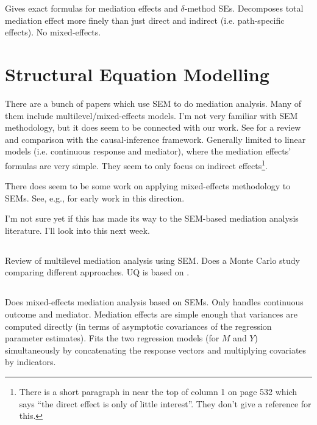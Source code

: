 \documentclass{article}
\begin{document}
Gives exact formulas for mediation effects and $\delta$-method SEs. Decomposes total mediation effect more finely than just direct and indirect (i.e. path-specific effects). No mixed-effects.

\section{Structural Equation Modelling}
\label{sec:SEM}

There are a bunch of papers which use SEM to do mediation analysis. Many of them include multilevel/mixed-effects models. I'm not very familiar with SEM methodology, but it does seem to be connected with our work. See \citet{Val13} for a review and comparison with the causal-inference framework. Generally limited to linear models (i.e. continuous response and mediator), where the mediation effects' formulas are very simple. They seem to only focus on indirect effects\footnote{There is a short paragraph in \citet{Zit21} near the top of column 1 on page 532 which says ``the direct effect is only of little interest''. They don't give a reference for this.}.

There does seem to be some work on applying mixed-effects methodology to SEMs. See, e.g., \citet{Rab04} for early work in this direction.

I'm not sure yet if this has made its way to the SEM-based mediation analysis literature. I'll look into this next week.

\subsection{\citet{Zig19}}

Review of multilevel mediation analysis using SEM. Does a Monte Carlo study comparing different approaches. UQ is based on \citet{Bau06}.

\subsection{\citet{Bau06}}

Does mixed-effects mediation analysis based on SEMs. Only handles continuous outcome and mediator. Mediation effects are simple enough that variances are computed directly (in terms of asymptotic covariances of the regression parameter estimates). Fits the two regression models (for $M$ and $Y$) simultaneously by concatenating the response vectors and multiplying covariates by indicators.
\end{document}
